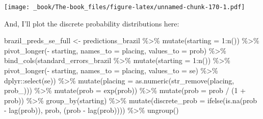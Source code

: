 \documentclass[
]{book}
\newenvironment{Shaded}{\begin{snugshade}}{\end{snugshade}}
\newcommand{\AttributeTok}[1]{\textcolor[rgb]{0.77,0.63,0.00}{#1}}
\newcommand{\DecValTok}[1]{\textcolor[rgb]{0.00,0.00,0.81}{#1}}
\newcommand{\FunctionTok}[1]{\textcolor[rgb]{0.00,0.00,0.00}{#1}}
\newcommand{\NormalTok}[1]{#1}
\newcommand{\OtherTok}[1]{\textcolor[rgb]{0.56,0.35,0.01}{#1}}
\newcommand{\SpecialCharTok}[1]{\textcolor[rgb]{0.00,0.00,0.00}{#1}}
\newcommand{\StringTok}[1]{\textcolor[rgb]{0.31,0.60,0.02}{#1}}
\begin{document}
\texttt{[image: \_book/The-book\_files/figure-latex/unnamed-chunk-170-1.pdf]}

And, I'll plot the discrete probability distributions here:

\begin{Shaded}
\begin{Highlighting}[]
\NormalTok{brazil\_preds\_se\_full }\OtherTok{\textless{}{-}}\NormalTok{ predictions\_brazil }\SpecialCharTok{\%\textgreater{}\%}
  \FunctionTok{mutate}\NormalTok{(}\AttributeTok{starting =} \DecValTok{1}\SpecialCharTok{:}\FunctionTok{n}\NormalTok{()) }\SpecialCharTok{\%\textgreater{}\%}
  \FunctionTok{pivot\_longer}\NormalTok{(}\SpecialCharTok{{-}}\NormalTok{ starting, }\AttributeTok{names\_to =} \StringTok{\textquotesingle{}placing\textquotesingle{}}\NormalTok{, }\AttributeTok{values\_to =} \StringTok{\textquotesingle{}prob\textquotesingle{}}\NormalTok{) }\SpecialCharTok{\%\textgreater{}\%} 
  \FunctionTok{bind\_cols}\NormalTok{(standard\_errors\_brazil }\SpecialCharTok{\%\textgreater{}\%} \FunctionTok{mutate}\NormalTok{(}\AttributeTok{starting =} \DecValTok{1}\SpecialCharTok{:}\FunctionTok{n}\NormalTok{()) }\SpecialCharTok{\%\textgreater{}\%}
  \FunctionTok{pivot\_longer}\NormalTok{(}\SpecialCharTok{{-}}\NormalTok{ starting, }\AttributeTok{names\_to =} \StringTok{\textquotesingle{}placing\textquotesingle{}}\NormalTok{, }\AttributeTok{values\_to =} \StringTok{\textquotesingle{}se\textquotesingle{}}\NormalTok{) }\SpecialCharTok{\%\textgreater{}\%}
\NormalTok{    dplyr}\SpecialCharTok{::}\FunctionTok{select}\NormalTok{(se)) }\SpecialCharTok{\%\textgreater{}\%}
  \FunctionTok{mutate}\NormalTok{(}\AttributeTok{placing =} \FunctionTok{as.numeric}\NormalTok{(}\FunctionTok{str\_remove}\NormalTok{(placing, }\StringTok{\textquotesingle{}prob\_\textquotesingle{}}\NormalTok{))) }\SpecialCharTok{\%\textgreater{}\%}
  \FunctionTok{mutate}\NormalTok{(}\AttributeTok{prob =} \FunctionTok{exp}\NormalTok{(prob)) }\SpecialCharTok{\%\textgreater{}\%}
  \FunctionTok{mutate}\NormalTok{(}\AttributeTok{prob =}\NormalTok{ prob }\SpecialCharTok{/}\NormalTok{ (}\DecValTok{1} \SpecialCharTok{+}\NormalTok{ prob)) }\SpecialCharTok{\%\textgreater{}\%}
  \FunctionTok{group\_by}\NormalTok{(starting) }\SpecialCharTok{\%\textgreater{}\%} 
  \FunctionTok{mutate}\NormalTok{(}\AttributeTok{discrete\_prob =} \FunctionTok{ifelse}\NormalTok{(}\FunctionTok{is.na}\NormalTok{(prob }\SpecialCharTok{{-}} \FunctionTok{lag}\NormalTok{(prob)), prob, (prob }\SpecialCharTok{{-}} \FunctionTok{lag}\NormalTok{(prob)))) }\SpecialCharTok{\%\textgreater{}\%}
  \FunctionTok{ungroup}\NormalTok{()}



\end{Highlighting}
\end{Shaded}
\end{document}
